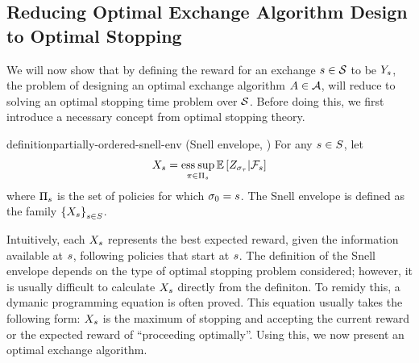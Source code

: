 
\subsection{Reducing Optimal Exchange Algorithm Design to Optimal Stopping}
\label{subsec:reduction-to-optimal-stopping}

We will now show that 
by defining the reward for an exchange $s\in\mathcal{S}$ to be 
$Y_{s}$, 
the problem of designing an optimal exchange algorithm $A\in\mathcal{A}$,
will reduce to solving an optimal stopping time problem over $\mathcal{S}$.
Before doing this, we first introduce a 
necessary concept
from optimal stopping theory.

\begin{restatable}{definition}{partially-ordered-snell-env}
    \textup{
        (Snell envelope, \citet{mandelbaum1981optimal})
    }
    For any $s\in S$, let
    \[
        X_{s}
        =
        \operatorname*{ess\hspace{0.08cm}sup}_{
            \pi
            \in
            \Pi_{s}
        }
        \mathbb{E}\left[
            Z_{
                \sigma_{
                    \tau
                }
            }
            | \mathcal{F}_{s}
        \right]
    \]
    where 
    $\Pi_{s}$ is the set of policies for which 
    \(
        \sigma_{0} = s
    \).
    The Snell envelope is defined as the family 
    \(
        \left\{
            X_{s}
        \right\}_{
            s\in S
        }
    \).
\end{restatable}  

Intuitively, each $X_{s}$ represents the best expected reward, given the information available
at $s$, following policies that start at $s$. The definition of the Snell envelope 
depends on the type of optimal stopping problem considered; however, it is usually difficult to calculate 
$X_{s}$ directly from the definiton. To remidy this, a dymanic programming equation is often
proved. 
This equation usually takes the following form: $X_{s}$ is the maximum of stopping and accepting
the current reward or the expected reward of ``proceeding optimally''.
Using this, we now present an optimal exchange algorithm.


